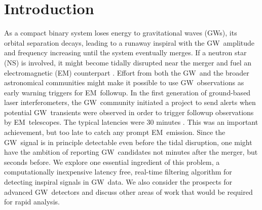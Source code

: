 \documentclass[preprint2]{aastex}
\newcommand{\NS}{NS}
\newcommand{\GW}{GW}%
\newcommand{\EM}{EM}%
\begin{document}
\section{Introduction}

As a compact binary system loses energy to gravitational waves (\GW{}s), its
orbital separation decays, leading to a runaway inspiral with the \GW\
amplitude and frequency increasing until the system eventually merges.  If a
neutron star (\NS) is involved, it might become tidally disrupted near the
merger and fuel an electromagnetic (\EM) counterpart \citep{shibata:2007}.
Effort from both the \GW\ and the broader astronomical communities might make
it possible to use \GW\ observations as early warning triggers for \EM\
followup. In the first generation of ground-based laser interferometers, the
\GW\ community initiated a project to send alerts when potential \GW\
transients were observed in order to trigger followup observations by \EM\
telescopes.  The typical latencies were 30 minutes \citep{HugheyGWPAW2011}.
This was an important achievement, but too late to catch any prompt \EM\
emission.  Since the \GW\ signal is in principle detectable even before the tidal
disruption, one might have the ambition of reporting \GW\ candidates not minutes
after the merger, but seconds before.  We explore one essential ingredient of
this problem, a computationally inexpensive latency free, real-time filtering
algorithm for detecting inspiral signals in \GW\ data.  We also consider the
prospects for advanced \GW\ detectors and discuss other areas of work that would
be required for rapid analysis.
\end{document}
